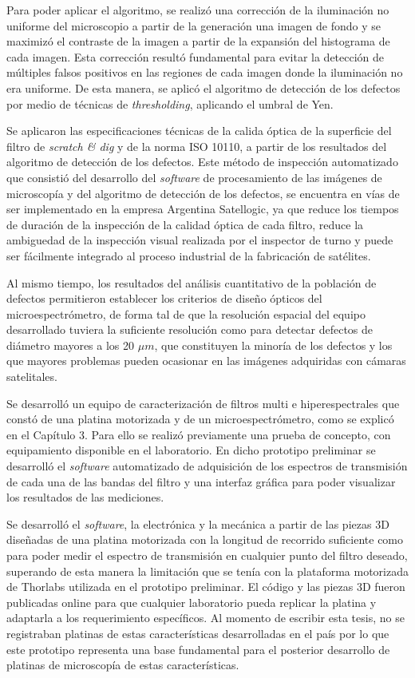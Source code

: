  Para poder aplicar el algoritmo, se realizó una corrección de la iluminación no uniforme del microscopio a partir de la generación una imagen de fondo y se maximizó el contraste de la imagen a partir de la expansión del histograma de cada imagen. Esta corrección resultó fundamental para evitar la detección de múltiples falsos positivos en las regiones de cada imagen donde la iluminación no era uniforme. De esta manera, se aplicó el algoritmo de detección de los defectos por medio de técnicas de \textit{thresholding}, aplicando el umbral de Yen.
 
Se aplicaron las especificaciones técnicas de la calida óptica de la superficie del filtro de \textit{scratch \& dig} y de la norma ISO 10110, a partir de los resultados del algoritmo de detección de los defectos. Este método de inspección automatizado que consistió del desarrollo del \textit{software} de procesamiento de las imágenes de microscopía y del algoritmo de detección de los defectos, se encuentra en vías de ser implementado en la empresa Argentina Satellogic, ya que reduce los tiempos de duración de la inspección de la calidad óptica de cada filtro, reduce la ambiguedad de la inspección visual realizada por el inspector de turno y puede ser fácilmente integrado al proceso industrial de la fabricación de satélites. 

Al mismo tiempo, los resultados del análisis cuantitativo de la población de defectos permitieron establecer los criterios de diseño ópticos del microespectrómetro, de forma tal de que la resolución espacial del equipo desarrollado tuviera la suficiente resolución como para detectar defectos de diámetro mayores a los 20 $\mu m$, que constituyen la minoría de los defectos y los que mayores problemas pueden ocasionar en las imágenes adquiridas con cámaras satelitales.

Se desarrolló un equipo de caracterización de filtros multi e hiperespectrales que constó de una platina motorizada y de un microespectrómetro, como se explicó en el Capítulo 3. Para ello se realizó previamente una prueba de concepto, con equipamiento disponible en el laboratorio. En dicho prototipo preliminar se desarrolló el \textit{software} automatizado de adquisición de los espectros de transmisión de cada una de las bandas del filtro y una interfaz gráfica para poder visualizar los resultados de las mediciones.

Se desarrolló el \textit{software}, la electrónica y la mecánica a partir de las piezas 3D diseñadas de una platina motorizada con la longitud de recorrido suficiente como para poder medir el espectro de transmisión en cualquier punto del filtro deseado, superando de esta manera la limitación que se tenía con la plataforma motorizada de Thorlabs utilizada en el prototipo preliminar. El código y las piezas 3D fueron publicadas online para que cualquier laboratorio pueda replicar la platina y adaptarla a los requerimiento específicos. Al momento de escribir esta tesis, no se registraban platinas de estas características desarrolladas en el país por lo que este prototipo representa una base fundamental para el posterior desarrollo de platinas de microscopía de estas características.


